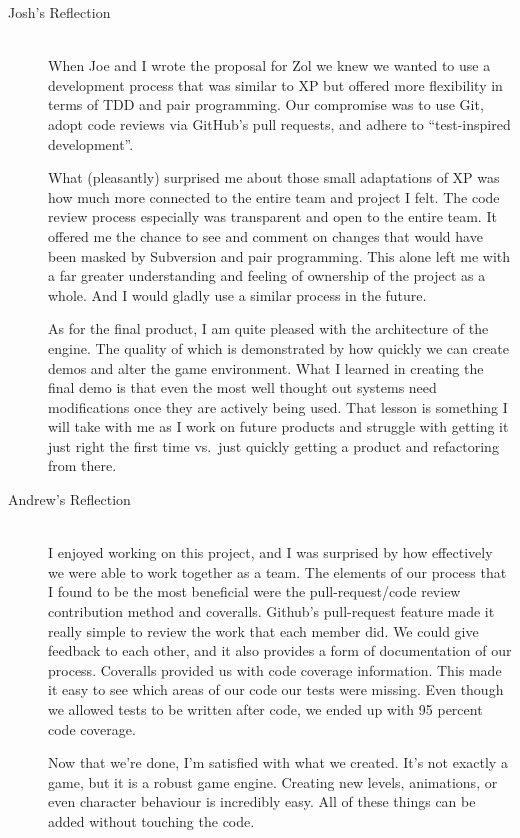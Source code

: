 \documentclass{article}
\begin{document}
		\begin{description}
			\item[Josh's Reflection] \hfill \\
			When Joe and I wrote the proposal for Zol we knew we wanted to
			use a development process that was similar to XP but offered more
			flexibility in terms of TDD and pair programming. Our compromise
			was to use Git, adopt code reviews via GitHub's pull requests,
			and adhere to ``test-inspired development''.

			What (pleasantly) surprised me about those small adaptations of
			XP was how much more connected to the entire team and project I
			felt. The code review process especially was transparent and
			open to the entire team. It offered me the chance to see and
			comment on changes that would have been masked by Subversion and
			pair programming. This alone left me with a far greater
			understanding and feeling of ownership of the project as a whole.
			And I would gladly use a similar process in the future.

			As for the final product, I am quite pleased with the architecture
			of the engine. The quality of which is demonstrated by how
			quickly we can create demos and alter the game environment. What
			I learned in creating the final demo is that even the most well
			thought out systems need modifications once they are actively
			being used. That lesson is something I will take with me as
			I work on future products and struggle with getting it just right
			the first time vs.\ just quickly getting a product and refactoring
			from there.

			\item[Andrew's Reflection] \hfill \\
			I enjoyed working on this project, and I was surprised by how effectively 
			we were able to work together as a team. The elements of our process that 
			I found to be the most beneficial were the pull-request/code review 
			contribution method and coveralls. Github's pull-request feature made it 
			really simple to review the work that each member did. We could give feedback 
			to each other, and it also provides a form of documentation of our process. 
			Coveralls provided us with code coverage information. This made it easy to 
			see which areas of our code our tests were missing. Even though we allowed 
			tests to be written after code, we ended up with 95 percent code coverage.

			Now that we're done, I'm satisfied with what we created. It's not exactly a 
			game, but it is a robust game engine. Creating new levels, animations, or 
			even character behaviour is incredibly easy. All of these things can be 
			added without touching the code. 


\end{description}
\end{document}
